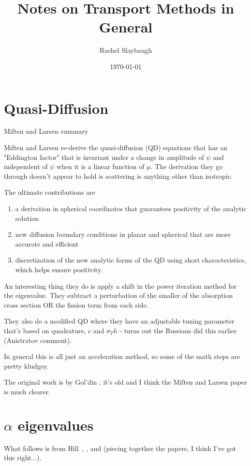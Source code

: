 \documentclass[12pt,twoside]{article}
\date{\today}
\title{Notes on Transport Methods in General}
\author{Rachel Slaybaugh}
\begin{document}
\maketitle

\section*{Quasi-Diffusion}

Miften and Larsen summary \cite{Miften1993}

Miften and Larsen re-derive the quasi-diffusion (QD) equations that has an "Eddington factor" that is invariant under a change in amplitude of $\psi$ and independent of $\psi$ when it is a linear function of $\mu$. The derivation they go through doesn't appear to hold is scattering is anything other than isotropic.

The ultimate contributions are
\begin{enumerate}
\item a derivation in spherical coordinates that guarantees positivity of the analytic solution
\item new diffusion boundary conditions in planar and spherical that are more accurate and efficient
\item discretization of the new analytic forms of the QD using short characteristics, which helps ensure positivity.
\end{enumerate} 

An interesting thing they do is apply a shift in the power iteration method for the eigenvalue. They subtract a perturbation of the smaller of the absorption cross section OR the fission term from each side. 

They also do a modified QD where they have an adjustable tuning parameter that's based on quadrature, $c$ and $\sigma_T h$ - turns out the Russians did this earlier (Anistratov comment). 

In general this is all just an acceleration method, so some of the math steps are pretty kludgey. 


\vspace*{2em}
The original work is by Gol'din \cite{Goldin1964}; it's old and I think the Miften and Larsen paper is much clearer. 

\section*{$\alpha$ eigenvalues}

What follows is from Hill~\cite{Hill1983}, \cite{Dahl2006}, and \cite{Shen2015} (piecing together the papers, I think I've got this right...).
\end{document}
